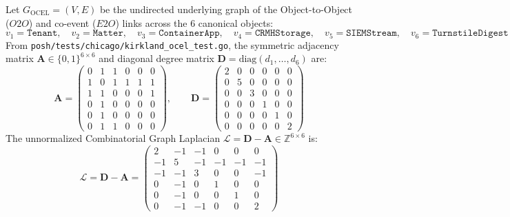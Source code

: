 \documentclass[10pt,twoside,openany]{book}
\theoremstyle{plain}
\theoremstyle{definition}
\theoremstyle{remark}
\newcommand{\Lap}{\mathcal{L}}
\newcommand{\Z}{\mathbb{Z}}
\begin{document}
Let $G_{\mathrm{OCEL}} = (V, E)$ be the undirected underlying graph of the Object-to-Object ($O2O$) and co-event ($E2O$) links across the 6 canonical objects:
\[
v_1 = \mathtt{Tenant}, \quad v_2 = \mathtt{Matter}, \quad v_3 = \mathtt{ContainerApp}, \quad v_4 = \mathtt{CRMHStorage}, \quad v_5 = \mathtt{SIEMStream}, \quad v_6 = \mathtt{TurnstileDigest}
\]
From \texttt{posh/tests/chicago/kirkland\_ocel\_test.go}, the symmetric adjacency matrix $\mathbf{A} \in \{0, 1\}^{6 \times 6}$ and diagonal degree matrix $\mathbf{D} = \mathrm{diag}(d_1, \dots, d_6)$ are:
\begin{equation}
\mathbf{A} = \begin{pmatrix}
0 & 1 & 1 & 0 & 0 & 0 \\
1 & 0 & 1 & 1 & 1 & 1 \\
1 & 1 & 0 & 0 & 0 & 1 \\
0 & 1 & 0 & 0 & 0 & 0 \\
0 & 1 & 0 & 0 & 0 & 0 \\
0 & 1 & 1 & 0 & 0 & 0
\end{pmatrix}, \qquad
\mathbf{D} = \begin{pmatrix}
2 & 0 & 0 & 0 & 0 & 0 \\
0 & 5 & 0 & 0 & 0 & 0 \\
0 & 0 & 3 & 0 & 0 & 0 \\
0 & 0 & 0 & 1 & 0 & 0 \\
0 & 0 & 0 & 0 & 1 & 0 \\
0 & 0 & 0 & 0 & 0 & 2
\end{pmatrix}
\end{equation}
The unnormalized Combinatorial Graph Laplacian $\Lap = \mathbf{D} - \mathbf{A} \in \Z^{6 \times 6}$ is:
\begin{equation}
\Lap = \mathbf{D} - \mathbf{A} = \begin{pmatrix}
2 & -1 & -1 & 0 & 0 & 0 \\
-1 & 5 & -1 & -1 & -1 & -1 \\
-1 & -1 & 3 & 0 & 0 & -1 \\
0 & -1 & 0 & 1 & 0 & 0 \\
0 & -1 & 0 & 0 & 1 & 0 \\
0 & -1 & -1 & 0 & 0 & 2
\end{pmatrix}
\end{equation}
\end{document}
